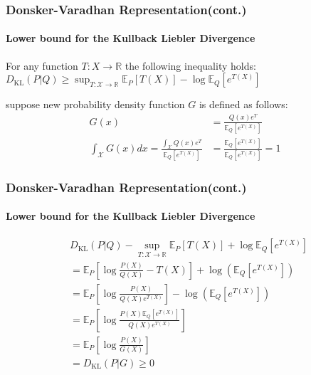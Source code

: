 \documentclass{beamer}
\begin{document}
	\begin{frame}
		\frametitle{Donsker-Varadhan Representation(cont.)}
		\framesubtitle{Lower bound for the Kullback Liebler Divergence}
		\begin{lemma}\label{lemma:lower_bound}
			For any function $T:X \rightarrow \mathbb{R}$ the following inequality holds:
			$D_{\text{KL}}(P | Q) \geq \sup_{T: \mathcal{X} \rightarrow \mathbb{R}} {\mathbb{E}_P[T(X)] - \log \mathbb{E}_Q[e^{T(X)}]}$
		\end{lemma}
		suppose new probability density function $G$ is defined as follows:
		\begin{align}
			G(x) &=\frac{Q(x)e^T}{\mathbb{E}_Q[e^{T(X)}]}\\
			\int_{\mathcal{X}} G(x)dx = \frac{\int_{\mathcal{X}} Q(x)e^T}{\mathbb{E}_Q[e^{T(X)}]} 
			&=\frac{\mathbb{E}_Q[e^{T(X)}]}{\mathbb{E}_Q[e^{T(X)}]} = 1 
		\end{align}
	\end{frame}

	\begin{frame}
		\frametitle{Donsker-Varadhan Representation(cont.)}
		\framesubtitle{Lower bound for the Kullback Liebler Divergence}
		\begin{align}
			&D_{\text{KL}}(P | Q) -\sup_{T: \mathcal{X} \rightarrow \mathbb{R}} {\mathbb{E}_P[T(X)] + \log \mathbb{E}_Q[e^{T(X)}]}\\
			&= \mathbb{E}_P[\log \frac{P(X)}{Q(X)}-T(X)] + \log(\mathbb{E}_Q[e^{T(X)}])\\
			&= \mathbb{E}_P[\log \frac{P(X)}{Q(X) e^{T(X)}}] - \log(\mathbb{E}_Q[e^{T(X)}])\\
			&= \mathbb{E}_P[\log \frac{P(X)\mathbb{E}_Q[e^{T(X)}]}{Q(X) e^{T(X)}}]\\
			&= \mathbb{E}_P[\log \frac{P(X)}{G(X)}]\\
			&= D_{\text{KL}}(P|G) \geq 0
		\end{align}
	\end{frame}

	


\end{document}
